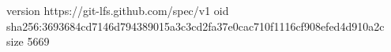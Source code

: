 version https://git-lfs.github.com/spec/v1
oid sha256:3693684cd7146d794389015a3c3cd2fa37e0cac710f1116cf908efed4d910a2c
size 5669
